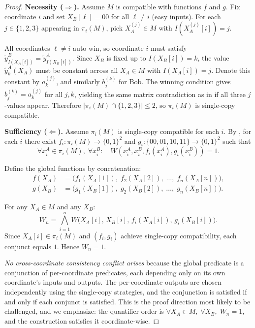 \documentclass[11pt,letterpaper]{article}
\newcommand{\ytildeA}{\tilde{y}^{A}}
\newcommand{\ytildeB}{\tilde{y}^{B}}
\begin{document}
\begin{proof}
\textbf{Necessity ($\Longrightarrow$).}
Assume $M$ is compatible with functions $f$ and $g$. Fix coordinate $i$ and set $X_B[\ell] = 00$ for all $\ell \neq i$ (easy inputs). For each $j \in \{1,2,3\}$ appearing in $\pi_i(M)$, pick $X_A^{(j)} \in M$ with $I(X_A^{(j)}[i]) = j$.

All coordinates $\ell \neq i$ auto-win, so coordinate $i$ must satisfy $\ytildeB_{I(X_A[i])} = \ytildeA_{I(X_B[i])}$. Since $X_B$ is fixed up to $I(X_B[i]) = k$, the value $\ytildeA_k(X_A)$ must be constant across all $X_A \in M$ with $I(X_A[i]) = j$. Denote this constant by $a_k^{(j)}$, and similarly $b_j^{(k)}$ for Bob. The winning condition gives $b_j^{(k)} = a_k^{(j)}$ for all $j,k$, yielding the same matrix contradiction as in  if all three $j$-values appear. Therefore $|\pi_i(M) \cap \{1,2,3\}| \leq 2$, so $\pi_i(M)$ is single-copy compatible.

\textbf{Sufficiency ($\Longleftarrow$).}
Assume $\pi_i(M)$ is single-copy compatible for each $i$. By , for each $i$ there exist $f_i : \pi_i(M) \to \{0,1\}^2$ and $g_i : \{00,01,10,11\} \to \{0,1\}^2$ such that
\[
  \forall x_i^A \in \pi_i(M),\; \forall x_i^B:\quad W(x_i^A, x_i^B, f_i(x_i^A), g_i(x_i^B)) = 1.
\]

Define the global functions by concatenation:
\begin{align*}
  f(X_A) &= \bigl(f_1(X_A[1]),\; f_2(X_A[2]),\; \ldots,\; f_n(X_A[n])\bigr), \\
  g(X_B) &= \bigl(g_1(X_B[1]),\; g_2(X_B[2]),\; \ldots,\; g_n(X_B[n])\bigr).
\end{align*}

For any $X_A \in M$ and any $X_B$:
\[
  W_n = \bigwedge_{i=1}^n W\bigl(X_A[i],\, X_B[i],\, f_i(X_A[i]),\, g_i(X_B[i])\bigr).
\]
Since $X_A[i] \in \pi_i(M)$ and $(f_i, g_i)$ achieve single-copy compatibility, each conjunct equals $1$. Hence $W_n = 1$.

\emph{No cross-coordinate consistency conflict arises} because the global predicate is a conjunction of per-coordinate predicates, each depending only on its own coordinate's inputs and outputs. The per-coordinate outputs are chosen independently using the single-copy strategies, and the conjunction is satisfied if and only if each conjunct is satisfied. This is the proof direction most likely to be challenged, and we emphasize: the quantifier order is $\forall X_A \in M,\; \forall X_B,\; W_n = 1$, and the construction satisfies it coordinate-wise.
\end{proof}
\end{document}
